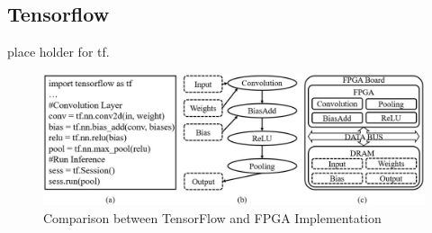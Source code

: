 \documentclass{acm_proc_article-sp-copy}
\begin{document}
\subsection{Tensorflow}
place holder for tf.

\begin{figure}
	\centering
	\includegraphics[width=1.0\linewidth]{./figure/tf.jpg}
	\caption{Comparison between TensorFlow and FPGA Implementation}
	\label{tf}
\end{figure}
\end{document}
